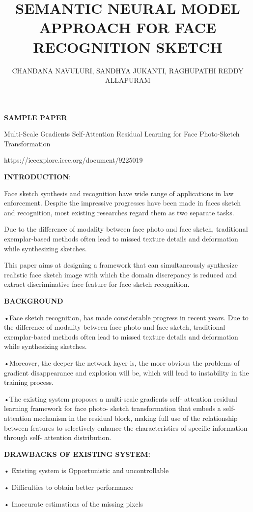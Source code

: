 \documentclass[journal]{IEEEtran} %
\title{\textbf{SEMANTIC NEURAL MODEL APPROACH FOR FACE RECOGNITION SKETCH}}
\author{CHANDANA NAVULURI, SANDHYA JUKANTI, RAGHUPATHI REDDY ALLAPURAM}
\begin{document}
\maketitle

\textbf
{SAMPLE PAPER}

Multi-Scale Gradients Self-Attention Residual Learning for Face          Photo-Sketch Transformation

 
{https://ieeexplore.ieee.org/document/9225019}

\textbf{INTRODUCTION}:

Face sketch synthesis and recognition have wide range of applications in law enforcement. Despite the impressive progresses have been made in faces sketch and recognition, most existing researches regard them as two separate tasks.

Due to the difference of modality between face photo and face sketch, traditional exemplar-based methods often lead to missed texture details and deformation while synthesizing sketches.

This paper aims at designing a framework that can simultaneously synthesize realistic face sketch image with which the domain discrepancy is reduced and extract discriminative face feature for face sketch recognition.

\textbf{BACKGROUND}

•Face sketch recognition, has made considerable progress in recent years. Due to the difference of modality between face photo and face sketch, traditional exemplar-based methods often lead to missed texture details and deformation while synthesizing sketches. 

•Moreover, the deeper the network layer is, the more obvious the problems of gradient disappearance and explosion will be, which will lead to instability in the training process. 

•The existing system proposes a multi-scale gradients self- attention residual learning framework for face photo- sketch transformation that embeds a self-attention mechanism in the residual block, making full use of the relationship between features to selectively enhance the characteristics of specific information through self- attention distribution. 

\textbf{DRAWBACKS OF EXISTING SYSTEM:}

•	Existing system is Opportunistic and uncontrollable

•	Difficulties to obtain better performance

•	Inaccurate estimations of the missing pixels
\end{document}
